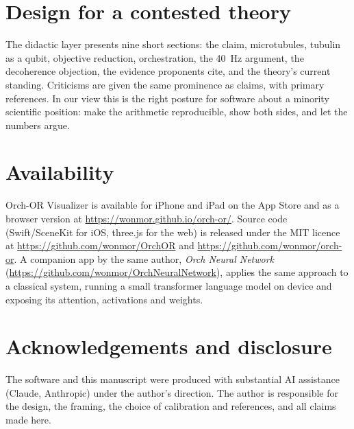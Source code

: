 \documentclass[11pt]{article}
\begin{document}
\section{Design for a contested theory}
The didactic layer presents nine short sections: the claim, microtubules, tubulin as a qubit, objective reduction, orchestration, the 40~Hz argument, the decoherence objection, the evidence proponents cite, and the theory's current standing. Criticisms are given the same prominence as claims, with primary references. In our view this is the right posture for software about a minority scientific position: make the arithmetic reproducible, show both sides, and let the numbers argue.

\section{Availability}
Orch-OR Visualizer is available for iPhone and iPad on the App Store and as a browser version at \url{https://wonmor.github.io/orch-or/}. Source code (Swift/SceneKit for iOS, three.js for the web) is released under the MIT licence at \url{https://github.com/wonmor/OrchOR} and \url{https://github.com/wonmor/orch-or}. A companion app by the same author, \emph{Orch Neural Network} (\url{https://github.com/wonmor/OrchNeuralNetwork}), applies the same approach to a classical system, running a small transformer language model on device and exposing its attention, activations and weights.

\section*{Acknowledgements and disclosure}
The software and this manuscript were produced with substantial AI assistance (Claude, Anthropic) under the author's direction. The author is responsible for the design, the framing, the choice of calibration and references, and all claims made here.
\end{document}
